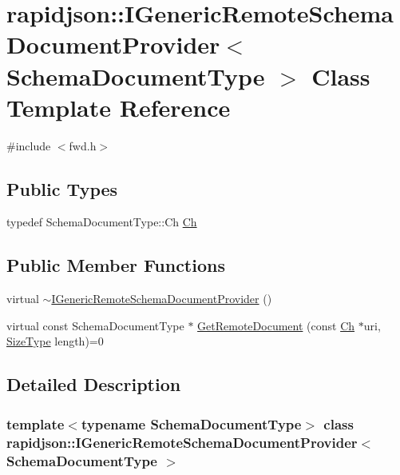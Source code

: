 \hypertarget{classrapidjson_1_1_i_generic_remote_schema_document_provider}{}\section{rapidjson\+::I\+Generic\+Remote\+Schema\+Document\+Provider$<$ Schema\+Document\+Type $>$ Class Template Reference}
\label{classrapidjson_1_1_i_generic_remote_schema_document_provider}


{\ttfamily \#include $<$fwd.\+h$>$}

\subsection*{Public Types}
\begin{DoxyCompactItemize}
\item 
typedef Schema\+Document\+Type\+::\+Ch \mbox{\hyperlink{classrapidjson_1_1_i_generic_remote_schema_document_provider_af1eaa40c0f7d7b778f2f24666d56a441}{Ch}}
\end{DoxyCompactItemize}
\subsection*{Public Member Functions}
\begin{DoxyCompactItemize}
\item 
virtual \mbox{\hyperlink{classrapidjson_1_1_i_generic_remote_schema_document_provider_a16421821dd1e9aaf9fb7bcb981296aab}{$\sim$\+I\+Generic\+Remote\+Schema\+Document\+Provider}} ()
\item 
virtual const Schema\+Document\+Type $\ast$ \mbox{\hyperlink{classrapidjson_1_1_i_generic_remote_schema_document_provider_a41dc360abb19df5a09c1ed1a83ec683c}{Get\+Remote\+Document}} (const \mbox{\hyperlink{classrapidjson_1_1_i_generic_remote_schema_document_provider_af1eaa40c0f7d7b778f2f24666d56a441}{Ch}} $\ast$uri, \mbox{\hyperlink{namespacerapidjson_a44eb33eaa523e36d466b1ced64b85c84}{Size\+Type}} length)=0
\end{DoxyCompactItemize}


\subsection{Detailed Description}
\subsubsection*{template$<$typename Schema\+Document\+Type$>$\newline
class rapidjson\+::\+I\+Generic\+Remote\+Schema\+Document\+Provider$<$ Schema\+Document\+Type $>$}



